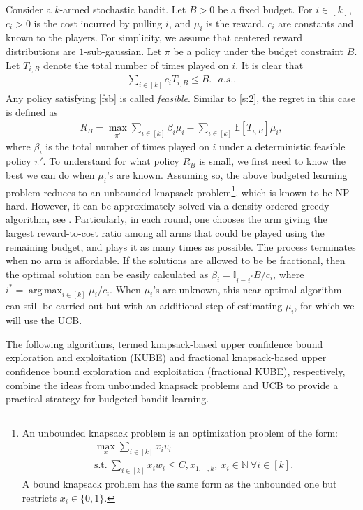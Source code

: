 \documentclass[10pt,a4article]{article}
\numberwithin{equation}{section}
\theoremstyle{plain}
\theoremstyle{definition}
\def\N{{\mathbb N}}
\def\E{{\mathbb E}}
\DeclareMathOperator*{\argmax}{arg\,max}
\begin{document}
Consider a $k$-armed stochastic bandit. Let $B>0$ be a fixed budget. For $i\in [k]$, $c_i>0$ is the cost incurred by pulling $i$, and $\mu_i$ is the reward. $c_i$ are constants and known to the players. For simplicity,  we assume that centered reward distributions are $1$-sub-gaussian. Let $\pi$ be a policy under the budget constraint $B$. Let $T_{i,B}$ denote the total number of times played on $i$. It is clear that 
\begin{align}
\sum_{i\in [k]}c_iT_{i,B}\leq B. \ \ \ a.s..\label{fsb}
\end{align}
Any policy satisfying \eqref{fsb} is called \emph{feasible}. Similar to \eqref{s:2}, the regret in this case is defined as 
\begin{align*}
R_B = \max_{\pi'}\sum_{i\in [k]}\beta_i\mu_i-\sum_{i\in [k]}\E[T_{i,B}]\mu_i,
\end{align*}
where $\beta_i$ is the total number of times played on $i$ under a deterministic feasible policy $\pi'$. To understand for what policy $R_B$ is small, we first need to know the best we can do when $\mu_i$'s are known. Assuming so, the above budgeted learning problem reduces to an unbounded knapsack problem\footnote{An unbounded knapsack problem is an optimization problem of the form:
\begin{align*}
&\max_x\sum_{i\in [k]}x_iv_i\\
&\text{s.t.}\ \sum_{i\in [k]}x_iw_i\leq C, x_{1, \cdots, k}, \ x_i\in\N\  \forall i\in [k]. 
\end{align*}
A bound knapsack problem has the same form as the unbounded one but restricts $x_i\in\{0, 1\}$.}, 
which is known to be NP-hard. However, it can be approximately solved via a density-ordered greedy algorithm, see \cite{Kohli_2004}. Particularly, in each round, one chooses the arm giving the largest reward-to-cost ratio among all arms that could be played using the remaining budget, and plays it as many times as possible. The process terminates when no arm is affordable. If the solutions are allowed to be be fractional, then the optimal solution can be easily calculated as $\beta_i = \mathbb I_{i=i^*}B/c_i$, where $i^*=\argmax_{i\in [k]}\mu_i/c_i$. When $\mu_i$'s are unknown, this near-optimal algorithm can still be carried out but with an additional step of estimating $\mu_i$, for which we will use the UCB. 

The following algorithms, termed knapsack-based upper confidence bound exploration and exploitation (KUBE) and fractional knapsack-based upper confidence bound exploration and exploitation (fractional KUBE), respectively, combine the ideas from unbounded knapsack problems and UCB to provide a practical strategy for budgeted bandit learning. 
\end{document}
